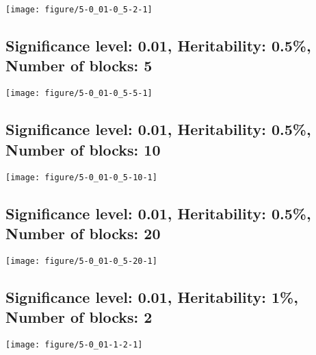 \documentclass[11pt,letter]{article}\usepackage[]{graphicx}\usepackage[]{color}
\makeatletter
\def\maxwidth{ %
  \ifdim\Gin@nat@width>\linewidth
    \linewidth
  \else
    \Gin@nat@width
  \fi
}
\newenvironment{knitrout}{}{} %
\makeatother
\begin{document}
\begin{knitrout}
\color{fgcolor}
\texttt{[image: figure/5-0\_01-0\_5-2-1]} 

\end{knitrout}

\newpage
\subsection{Significance level: 0.01, Heritability: 0.5\%, Number of blocks: 5}

\begin{knitrout}
\color{fgcolor}
\texttt{[image: figure/5-0\_01-0\_5-5-1]} 

\end{knitrout}

\newpage
\subsection{Significance level: 0.01, Heritability: 0.5\%, Number of blocks: 10}

\begin{knitrout}
\color{fgcolor}
\texttt{[image: figure/5-0\_01-0\_5-10-1]} 

\end{knitrout}

\newpage
\subsection{Significance level: 0.01, Heritability: 0.5\%, Number of blocks: 20}

\begin{knitrout}
\color{fgcolor}
\texttt{[image: figure/5-0\_01-0\_5-20-1]} 

\end{knitrout}

\newpage
\subsection{Significance level: 0.01, Heritability: 1\%, Number of blocks: 2}

\begin{knitrout}
\color{fgcolor}
\texttt{[image: figure/5-0\_01-1-2-1]} 

\end{knitrout}
\end{document}

